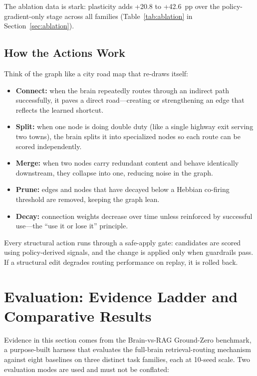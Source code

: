 \documentclass[11pt]{article}
\begin{document}
The ablation data is stark: plasticity adds +20.8 to +42.6~pp over the
policy-gradient-only stage across all families (Table~\ref{tab:ablation} in
Section~\ref{sec:ablation}).

\subsection{How the Actions Work}
\label{sec:actions}

Think of the graph like a city road map that re-draws itself:
\begin{itemize}
  \item \textbf{Connect:} when the brain repeatedly routes through an indirect
        path successfully, it paves a direct road---creating or strengthening an
        edge that reflects the learned shortcut.
  \item \textbf{Split:} when one node is doing double duty (like a single highway
        exit serving two towns), the brain splits it into specialized nodes so
        each route can be scored independently.
  \item \textbf{Merge:} when two nodes carry redundant content and behave
        identically downstream, they collapse into one, reducing noise in the
        graph.
  \item \textbf{Prune:} edges and nodes that have decayed below a Hebbian
        co-firing threshold are removed, keeping the graph lean.
  \item \textbf{Decay:} connection weights decrease over time unless reinforced
        by successful use---the ``use it or lose it'' principle.
\end{itemize}

Every structural action runs through a safe-apply gate: candidates are scored
using policy-derived signals, and the change is applied only when guardrails
pass. If a structural edit degrades routing performance on replay, it is rolled
back.

\section{Evaluation: Evidence Ladder and Comparative Results}
\label{sec:eval}

Evidence in this section comes from the Brain-vs-RAG Ground-Zero benchmark,
a purpose-built harness that evaluates the full-brain retrieval-routing mechanism
against eight baselines on three distinct task families, each at 10-seed scale.
Two evaluation modes are used and must not be conflated:
\end{document}
